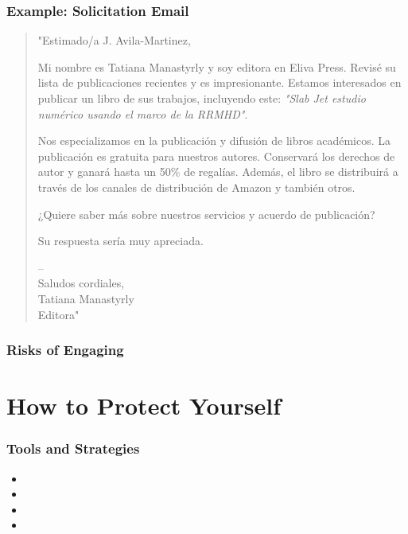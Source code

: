 \begin{frame}
  \frametitle{Example: Solicitation Email}
  \justifying
  \small
  \begin{quote}
    "Estimado/a J. Avila-Martinez,

    Mi nombre es Tatiana Manastyrly y soy editora en Eliva Press. Revisé su lista de publicaciones recientes y es impresionante. Estamos interesados en publicar un libro de sus trabajos, incluyendo este: \textit{"Slab Jet estudio numérico usando el marco de la RRMHD"}.

    Nos especializamos en la publicación y difusión de libros académicos. La publicación es gratuita para nuestros autores. Conservará los derechos de autor y ganará hasta un 50\% de regalías. Además, el libro se distribuirá a través de los canales de distribución de Amazon y también otros.

    ¿Quiere saber más sobre nuestros servicios y acuerdo de publicación?

    Su respuesta sería muy apreciada.

    --\\
    Saludos cordiales,\\
    Tatiana Manastyrly\\
    Editora"
  \end{quote}
\end{frame}

\begin{frame}
  \frametitle{Risks of Engaging}
\end{frame}

\section{How to Protect Yourself}

\begin{frame}
  \frametitle{Tools and Strategies}

  \bigskip
  \begin{itemize}
    \item {}
    \item {}
    \item {}
    \item {}
  \end{itemize}
\end{frame}

